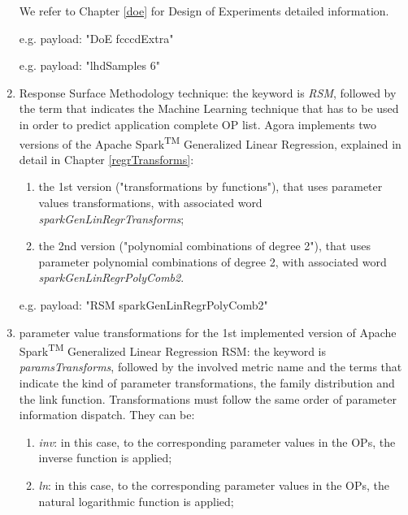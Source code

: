 \begin{enumerate}
\begin{enumerate}
    \end{enumerate}
    
    We refer to Chapter \ref{doe} for Design of Experiments detailed information.
    
    e.g. payload: "DoE fcccdExtra"
    
    e.g. payload: "lhdSamples 6"
    
    \item Response Surface Methodology technique: the keyword is \textit{RSM}, followed by the term that indicates the Machine Learning technique that has to be used in order to predict application complete OP list. Agora implements two versions of the Apache Spark\textsuperscript{TM} Generalized Linear Regression, explained in detail in Chapter \ref{regrTransforms}:
    
    \begin{enumerate}
    
        \item the 1st version ("transformations by functions"), that uses parameter values transformations, with associated word \textit{sparkGenLinRegrTransforms};
        
        \item the 2nd version ("polynomial combinations of degree 2"), that uses parameter polynomial combinations of degree 2, with associated word \textit{sparkGenLinRegrPolyComb2}.
    
    \end{enumerate}
    
    e.g. payload: "RSM sparkGenLinRegrPolyComb2"
    
    \item parameter value transformations for the 1st implemented version of Apache Spark\textsuperscript{TM} Generalized Linear Regression RSM: the keyword is \textit{paramsTransforms}, followed by the involved metric name and the terms that indicate the kind of parameter transformations, the family distribution and the link function. Transformations must follow the same order of parameter information dispatch. They can be:
    
    \begin{enumerate}
    
        \item \textit{inv}: in this case, to the corresponding parameter values in the OPs, the inverse function is applied;
        
        \item \textit{ln}: in this case, to the corresponding parameter values in the OPs, the natural logarithmic function is applied;
        

\end{enumerate}
\end{enumerate}
